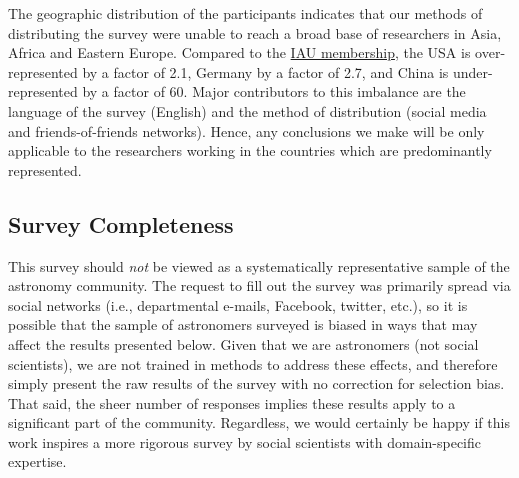The geographic distribution of the participants indicates that our methods of distributing the survey were unable to reach a broad base of researchers in Asia, Africa and Eastern Europe. Compared to the \href{http://www.iau.org/administration/membership/individual/distribution/}{IAU membership}, the USA is over-represented by a factor of 2.1, Germany by a factor of 2.7, and China is under-represented by a factor of 60. Major contributors to this imbalance are the language of the survey (English) and the method of distribution (social media and friends-of-friends networks). Hence, any conclusions we make will be only applicable to the researchers working in the countries which are predominantly represented.

\subsection{Survey Completeness}

This survey should \emph{not} be viewed as a systematically representative sample of the astronomy community.  
The request to fill out the survey was primarily spread via social networks (i.e., departmental e-mails, Facebook, twitter, etc.), so it is possible that the sample of astronomers surveyed is biased in ways that may affect the results presented below.
Given that we are astronomers (not social scientists), we are not trained in methods to address these effects, and therefore simply present the raw results of the survey with no correction for selection bias.
That said, the sheer number of responses implies these results apply to a significant part of the community.
Regardless, we would certainly be happy if this work inspires a more rigorous survey by social scientists with domain-specific expertise.

    